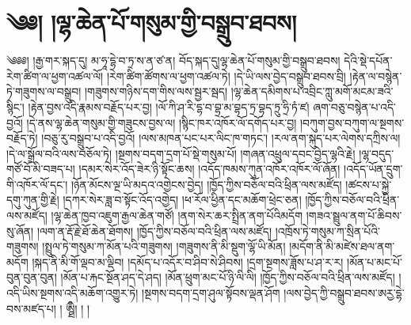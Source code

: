\setcounter{footnote}{0} 
\chapter{༄༅། །ལྷ་ཆེན་པོ་གསུམ་གྱི་བསྒྲུབ་ཐབས།}༄༅༅། །རྒྱ་གར་སྐད་དུ། མ་ཧཱ་དྷེ་བ་ཏྲ་ས་ན་ཙ་ན། བོད་སྐད་དུ།ལྷ་ཆེན་པོ་གསུམ་གྱི་བསྒྲུབ་ཐབས། དེའི་སྡེ་དཔོན་རེག་ཚིག་ལ་ཕྱག་འཚལ་ལོ། །རེག་ཚིག་ཚོགས་ལ་ཕྱག་འཚལ་ཏེ། །དེ་ཡི་ལས་བྱེད་བསྒྲུབ་ཐབས་བྲི། །རྟེན་ལ་བསྙེན་ཏེ་གཟུགས་ལ་བསྒྲུབ། །གཟུགས་གཉིས་དག་གིས་ལས་སྦྱར་སྦད། །ལྷ་ཆེན་དམིགས་པ་འབྲིང་ཀླུ་མགོ་མངམ་ཟའི་སྙིང་། །རྟེན་བྱས་འདི་རྣམས་བརྗོད་པར་བྱ། །ལོ་ཀི་ཤ་རི་དྷ་བ་བྷྲ་མ་བྷད་ཏྲ་བྷད་ཏྲུ་ཧྲི་ཏཾ་ཛ། ཞག་བཅུ་བསྙེན་པ་འདི་བྱའོ། །དེ་ནས་ལྷ་ཆེན་གསུམ་གྱི་གཟུངས་བྱས་ལ། །སྙིང་ཁར་འཁོར་ལོ་དགོད་པར་བྱ། །བཀུག་བྱས་བཀུག་ལ་སྔགས་བརྗོད་ཏེ། །བཅུ་རུ་བསྒྲུབ་པ་འདི་བྱའོ། །ལས་མཁན་པང་པར་ལིང་ཁ་གཏང་། །རལ་ནག་སྐུད་པར་ལེགས་དཀྲིས་ལ། །དེ་ལ་སྒྲོལ་བའི་ལས་བཅོལ་ཏེ། །སྔགས་བདག་དྲག་པོ་སྡེ་གསུམ་པོ། །གཞན་འཕྲུལ་དབང་བྱེད་ལྷའི་རྗེ། །ལྷ་བདུད་གཙོ་བོ་མི་བཟད་པ། །དམར་སེར་འོད་ཟེར་ཉི་སྟོང་ཆས། །འདོད་ཁམས་ཀུན་འཁོར་འཁོར་ལོ་ཞོན། །འདོད་ཡོན་དྲུག་གི་འཁོར་ལོ་དང་། །ཉོན་མོངས་ལྔ་ཡི་མདའ་འགྱེངས་བྱེད། །ཁྱོད་ཀྱིས་བཅོལ་བའི་ཕྲིན་ལས་མཛོད། །ཚངས་པ་སྐྱེ་དགུ་ཀུན་གྱི་རྗེ། །དཀར་སེར་ཟླ་བ་སྟོང་འོད་འགྱེད། །ཕ་རོལ་ཕྱིན་དང་མཆོག་ཕྲེང་ཅན། །ཁྱོད་ཀྱིས་བཅོལ་བའི་ཕྲིན་ལས་མཛོད། །ལྷ་ཆེན་ཁྱབ་འཇུག་རྒྱལ་ཆེན་གཙོ། །ནག་སེར་ཆར་སྤྲིན་ནག་པོའིམདོག །གཟའ་སྦྲུལ་ནག་པོ་ཆིབས་སུ་ཞོན། །ལག་ན་རྡོ་རྗེ་ཐོ་ཆེན་ཐོགས། །ཁྱོད་ཀྱིས་བཅོལ་བའི་ཕྲིན་ལས་མཛོད། །འཁྲོས་ཏེ་གསུམ་ཀ་སྲིན་པོའི་གཟུགས། །སྤྲུལ་ཏེ་གསུམ་ཀ་མོན་པའི་གཟུགས། །གཟུགས་ནི་མི་སྡུག་ལྷོ་ཡི་མོན། །མདོག་ནི་མི་མཛེས་ཐལ་ནག་མདོག །སྐད་ནི་མི་གོ་ལྡབ་མ་ལྡིབ། །དམོད་པ་འདོར་བ་ཤིབ་སེ་ཤིབས། །དྲག་སྔགས་ཟློས་པ་ཤ་ར་ར། །མོན་པ་མང་པོ་བུན་བུན་བུན། །མོན་པ་རྐང་སྔོན་ཤད་དེ་ཤད། །མོན་ཕྲུག་མང་པོ་ཉི་ལི་ལི། །ཁྱོད་ཀྱིས་བཅོལ་བའི་ཕྲིན་ལས་མཛོད། །འདི་ཡིས་སྔགས་འདི་མཆོག་འགྱུར་ཏེ། །སྔགས་བདག་དྲག་ཤུལ་སྟོབས་ལྡན་ཤོག །ལས་བྱེད་ཀྱི་བསྒྲུབ་ཐབས་ཨརྱ་དྷེ་བས་མཛད་པ། ། ཨྠྀི། ། །
